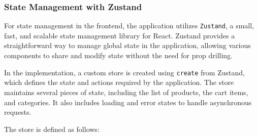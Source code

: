 \subsubsection{State Management with Zustand}

For state management in the frontend, the application utilizes \texttt{Zustand}, a small, fast, and scalable state management library for React. Zustand provides a straightforward way to manage global state in the application, allowing various components to share and modify state without the need for prop drilling.

In the implementation, a custom store is created using \texttt{create} from Zustand, which defines the state and actions required by the application. The store maintains several pieces of state, including the list of products, the cart items, and categories. It also includes loading and error states to handle asynchronous requests.

The store is defined as follows:

